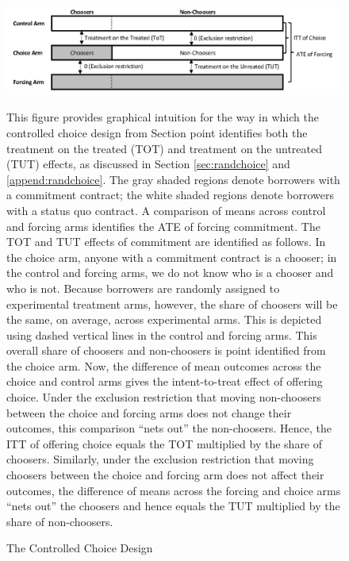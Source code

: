 \documentclass[oneside,11pt]{article}
\begin{document}
\begin{figure}[H]
\caption{The Controlled Choice Design}
    \label{tot_tut_graph}
    \begin{center}
        \centering
        \includegraphics[width=1.0\textwidth]{Figuras/tot_tut_intuition.png}
    \end{center}
    \scriptsize
    This figure provides graphical intuition for the way in which the controlled choice design from Section point identifies both the treatment on the treated (TOT) and treatment on the untreated (TUT) effects, as discussed in Section \ref{sec:randchoice} and \ref{append:randchoice}. 
    The gray shaded regions denote borrowers with a commitment contract; the white shaded regions denote borrowers with a status quo contract.
    A comparison of means across control and forcing arms identifies the ATE of forcing  commitment.
    The TOT and TUT effects of commitment are identified as follows.
    In the choice arm, anyone with a commitment contract is a chooser; in the control and forcing arms, we do not know who is a chooser and who is not.
    Because borrowers are randomly assigned to experimental treatment arms, however, the share of choosers will be the same, on average, across experimental arms.
    This is depicted using dashed vertical lines in the control and forcing arms.
    This overall share of choosers and non-choosers is point identified from the choice arm.
    Now, the difference of mean outcomes across the choice and control arms gives the intent-to-treat effect of offering choice.
    Under the exclusion restriction that moving non-choosers between the choice and forcing arms does not change their outcomes, this comparison ``nets out'' the non-choosers.
    Hence, the ITT of offering choice equals the TOT multiplied by the share of choosers. 
    Similarly, under the exclusion restriction that moving choosers between the choice and forcing arm does not affect their outcomes, the difference of means across the forcing and choice arms ``nets out'' the choosers and hence equals the TUT multiplied by the share of non-choosers.
    

\end{figure}   
\end{document}
